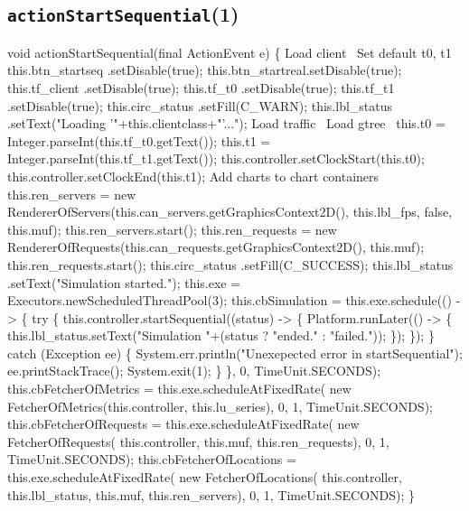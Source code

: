 \subsection{\texttt{actionStartSequential}(1)}
\nwenddocs{}\endmoddef{}
void actionStartSequential(final ActionEvent e) \{
  \LA{}Load client~{\nwtagstyle{}}\RA{}
  \LA{}Set default t0, t1~{\nwtagstyle{}}\RA{}
  this.btn_startseq .setDisable(true);
  this.btn_startreal.setDisable(true);
  this.tf_client     .setDisable(true);
  this.tf_t0        .setDisable(true);
  this.tf_t1        .setDisable(true);
  this.circ_status  .setFill(C_WARN);
  this.lbl_status   .setText("Loading '"+this.clientclass+"'...");
  \LA{}Load traffic~{\nwtagstyle{}}\RA{}
  \LA{}Load gtree~{\nwtagstyle{}}\RA{}
  this.t0 = Integer.parseInt(this.tf_t0.getText());
  this.t1 = Integer.parseInt(this.tf_t1.getText());
  this.controller.setClockStart(this.t0);
  this.controller.setClockEnd(this.t1);
  \LA{}Add charts to chart containers~{\nwtagstyle{}}\RA{}
  this.ren_servers = new RendererOfServers(this.can_servers.getGraphicsContext2D(), this.lbl_fps, false, this.muf);
  this.ren_servers.start();
  this.ren_requests = new RendererOfRequests(this.can_requests.getGraphicsContext2D(), this.muf);
  this.ren_requests.start();
  this.circ_status  .setFill(C_SUCCESS);
  this.lbl_status   .setText("Simulation started.");
  this.exe = Executors.newScheduledThreadPool(3);
  this.cbSimulation = this.exe.schedule(() -> \{
    try \{
      this.controller.startSequential((status) -> \{
        Platform.runLater(() -> \{
          this.lbl_status.setText("Simulation "+(status ? "ended." : "failed."));
        \});
      \});
    \} catch (Exception ee) \{
      System.err.println("Unexepected error in startSequential");
      ee.printStackTrace();
      System.exit(1);
    \}
  \}, 0, TimeUnit.SECONDS);
  this.cbFetcherOfMetrics = this.exe.scheduleAtFixedRate(
      new FetcherOfMetrics(this.controller, this.lu_series), 0, 1, TimeUnit.SECONDS);
  this.cbFetcherOfRequests = this.exe.scheduleAtFixedRate(
      new FetcherOfRequests(
        this.controller, this.muf, this.ren_requests), 0, 1, TimeUnit.SECONDS);
  this.cbFetcherOfLocations = this.exe.scheduleAtFixedRate(
      new FetcherOfLocations(
        this.controller, this.lbl_status, this.muf, this.ren_servers), 0, 1, TimeUnit.SECONDS);
\}
\eatline
{}\nwendcode{}\nwdocspar
